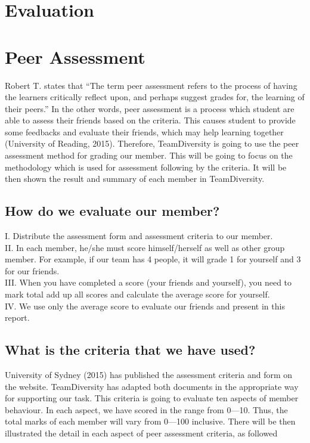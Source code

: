 \documentclass[11pt]{article}
\begin{document}
\section{Evaluation}

\newpage	
\section{Peer Assessment}

\indent\indent Robert T. \cite{roberts2006self} states that “The term peer assessment refers to the process of having the learners critically reflect upon, and perhaps suggest grades for, the learning of their peers.” In the other words, peer assessment is a process which student are able to assess their friends based on the criteria. This causes student to provide some feedbacks and evaluate their friends, which may help learning together (University of Reading, 2015). Therefore, TeamDiversity is going to use the peer assessment method for grading our member. This will be going to focus on the methodology which is used for assessment following by the criteria. It will be then shown the result and summary of each member in TeamDiversity. 
	\subsection{How do we evaluate our member?}
	
	\indent\indent I. Distribute the assessment form and assessment criteria to our member.\\
	\indent II. In each member, he/she must score himself/herself as well as other group member. For example, if our team has 4 people, it will grade 1 for yourself and 3 for our friends.\\
	\indent III. When you have completed a score (your friends and yourself), you need to mark total add up all scores and calculate the average score for yourself. \\
	\indent IV. We use only the average score to evaluate our friends and present in this report. 


	\subsection{What is the criteria that we have used?}
	\indent\indent\indent University of Sydney (2015) has published the assessment criteria and form on the website. TeamDiversity has adapted both documents in the appropriate way for supporting our task. This criteria is going to evaluate ten aspects of member behaviour. In each aspect, we have scored in the range from 0—10. Thus, the total marks of each member will vary from 0—100 inclusive. There will be then illustrated the detail in each aspect of peer assessment criteria, as followed \newline 
\end{document}
